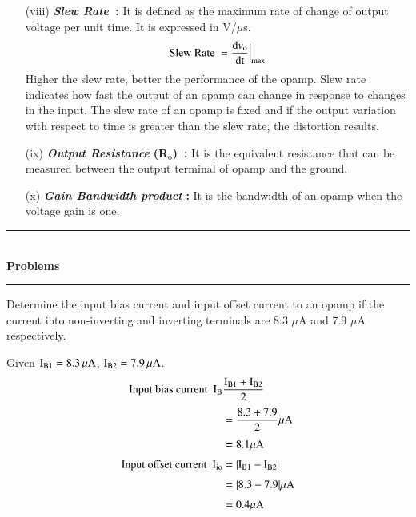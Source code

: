 \begin{itemize}
\item[(viii)] {\it\bfseries Slew Rate~}{\bf :} It is defined as the maximum rate of change of output voltage per unit time. It is expressed in V/$\mu$s.
\begin{equation}
\text{Slew Rate~} = \frac{\text{d}v_{\textrm{o}}}{\text{dt}}\Big|_{\max}\label{eq4.8}
\end{equation}
Higher the slew rate, better the performance of the opamp. Slew rate indicates how fast the output of an opamp can change in response to changes in the input. The slew rate of an opamp is fixed and if the output variation with respect to time is greater than the slew rate, the distortion results.

\item[(ix)] {\it\bfseries Output Resistance} {\bf (R$_{\text{o}}$)~:} It is the equivalent resistance that can be measured between the output terminal of opamp and the ground.

\item[(x)] {\it\bfseries Gain Bandwidth product} {\bf :} It is the bandwidth of an opamp when the voltage gain is one.
\end{itemize}

\begin{center}
\rule{4cm}{1pt}\\
{\bf\Large Problems}\\[-3pt]
\rule{4cm}{1pt}
\end{center}

\begin{problem}\label{prob4.5}
Determine the input bias current and input offset current to an opamp if the current into non-inverting and inverting terminals are 8.3 $\mu$A and 7.9 $\mu$A respectively.
\end{problem}

\begin{solution}
Given $\textrm{I}_{\text{B1}}=8.3\,\mu\textrm{A}$, $\textrm{I}_{\text{B2}}=7.9\,\mu \textrm{A}$.
\begin{align*}
\text{Input bias current~ } \textrm{I}_{\textrm{B}} & \frac{\textrm{I}_{\textrm{B} 1}+\textrm{I}_{\textrm{B} 2}}{2}\\[3pt]
&= \frac{8.3+7.9}{2}\mu\textrm{A}\\[3pt]
&= 8.1\mu\textrm{A}\\[3pt]
\text{Input offset current~ } \textrm{I}_{\text{io}} &= |\textrm{I}_{\textrm{B} 1}-\textrm{I}_{\textrm{B} 2}|\\[3pt]
&= |8.3-7.9|\mu\textrm{A}\\[3pt]
&= 0.4 \mu\textrm{A}
\end{align*}
\end{solution}

